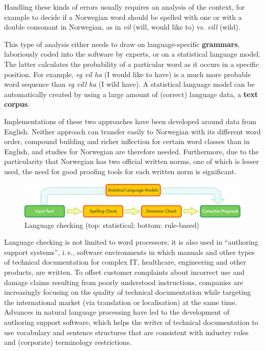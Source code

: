 \begin{multicols}{2}
Handling these kinds of errors usually requires an analysis of the context, for example to decide if a Norwegian word should be spelled with one or with a double consonant in Norwegian, as in \textit{vil} (will, would like to) vs. \textit{vill} (wild).

This type of analysis either needs to draw on language-specific \textbf{grammars}, laboriously coded into the software by experts, or on a statistical language model. The latter calculates the probability of a particular word as it occurs in a specific position. For example, \textit{eg vil ha} (I would like to have) is a much more probable word sequence than \textit{eg vill ha} (I wild have). A statistical language model can be automatically created by using a large amount of (correct) language data, a \textbf{text corpus}.

Implementations of these two approaches have been developed around data from English. Neither approach can transfer easily to Norwegian with its different word order, compound building and richer inflection for certain word classes than in English, and studies for Norwegian are therefore needed. Furthermore, due to the particularity that Norwegian has two official written norms, one of which is lesser used, the need for good proofing tools for each written norm is significant. 

\begin{figure}[htb]
  \center
  \includegraphics[width=\textwidth]{../_media/english/language_checking}
  \caption{Language checking (top: statistical; bottom: rule-based)}
  \label{fig:langcheckingaarch_en}
\end{figure}

Language checking is not limited to word processors; it is also used in “authoring support systems”, i.\,e., software environments in which manuals and other types of technical documentation for complex IT, healthcare, engineering and other products, are written. To offset customer complaints about incorrect use and damage claims resulting from poorly understood instructions, companies are increasingly focusing on the quality of technical documentation while targeting the international market (via translation or localisation) at the same time. Advances in natural language processing have led to the development of authoring support software, which helps the writer of technical documentation to use vocabulary and sentence structures that are consistent with industry rules and (corporate) terminology restrictions.


\end{multicols}
